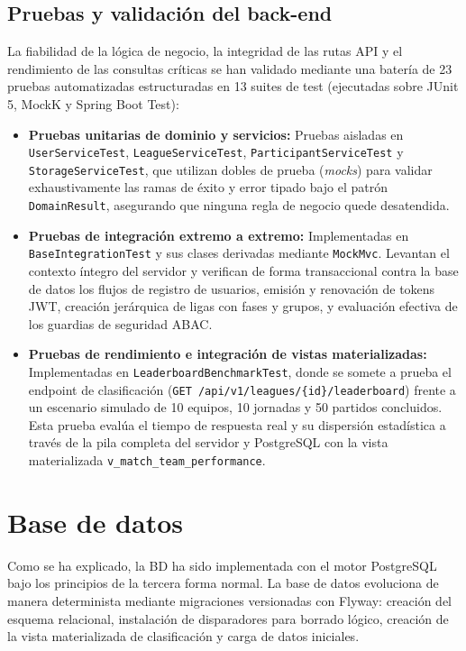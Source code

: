 \subsection{Pruebas y validación del back-end}
La fiabilidad de la lógica de negocio, la integridad de las rutas API y el rendimiento de las consultas críticas se han validado mediante una batería de 23 pruebas automatizadas estructuradas en 13 suites de test (ejecutadas sobre JUnit 5, MockK y Spring Boot Test):
\begin{itemize}
    \item \textbf{Pruebas unitarias de dominio y servicios:} Pruebas aisladas en \texttt{UserServiceTest}, \texttt{LeagueServiceTest}, \texttt{ParticipantServiceTest} y \texttt{StorageServiceTest}, que utilizan dobles de prueba (\textit{mocks}) para validar exhaustivamente las ramas de éxito y error tipado bajo el patrón \texttt{DomainResult}, asegurando que ninguna regla de negocio quede desatendida.
    \item \textbf{Pruebas de integración extremo a extremo:} Implementadas en \texttt{BaseIntegrationTest} y sus clases derivadas mediante \texttt{MockMvc}. Levantan el contexto íntegro del servidor y verifican de forma transaccional contra la base de datos los flujos de registro de usuarios, emisión y renovación de tokens JWT, creación jerárquica de ligas con fases y grupos, y evaluación efectiva de los guardias de seguridad ABAC.
    \item \textbf{Pruebas de rendimiento e integración de vistas materializadas:} Implementadas en \texttt{LeaderboardBenchmarkTest}, donde se somete a prueba el endpoint de clasificación (\texttt{GET /api/v1/leagues/\{id\}/leaderboard}) frente a un escenario simulado de 10 equipos, 10 jornadas y 50 partidos concluidos. Esta prueba evalúa el tiempo de respuesta real y su dispersión estadística a través de la pila completa del servidor y PostgreSQL con la vista materializada \texttt{v\_match\_team\_performance}.
\end{itemize}

\section{Base de datos}
Como se ha explicado, la \ac{BD} ha sido implementada con el motor PostgreSQL bajo los principios de la tercera forma normal. La base de datos evoluciona de manera determinista mediante migraciones versionadas con Flyway: creación del esquema relacional, instalación de disparadores para borrado lógico, creación de la vista materializada de clasificación y carga de datos iniciales.

